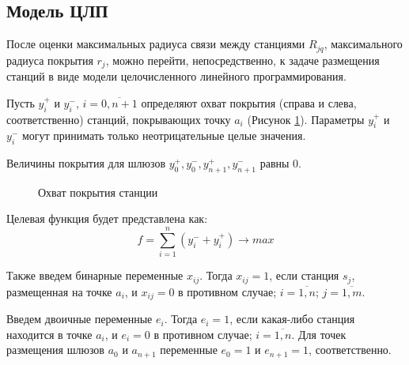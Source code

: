 


\subsection{Модель ЦЛП}

После оценки максимальных радиуса связи между станциями $R_{jq}$, максимального радиуса покрытия $r_j$, можно перейти, непосредственно, к задаче размещения станций в виде модели целочисленного линейного программирования.

Пусть $y_i^+$ и $y_i^-$, $i= \overline{0,n+1}$ определяют охват покрытия (справа и слева, соответственно) станций, покрывающих точку $a_i$ (Рисунок \cref{fig:part3_station_coverage}). Параметры $y_i^+$ и $y_i^-$ могут принимать только неотрицательные целые значения.

Величины  покрытия для шлюзов $y_0^+, y_0^-, y_{n+1}^+, y_{n+1}^-$ равны 0.

\begin{figure}[ht]
  \caption{Охват покрытия станции}\label{fig:part3_station_coverage}
\end{figure}
 
Целевая функция будет представлена как:
\begin{equation}
  \label{eq:part3_objective_function}
  f =  \sum\limits_{i=1}^n (y_i^- + y_i^+) \rightarrow max
\end{equation}

Также введем бинарные переменные $x_{ij}$. Тогда $x_{ij}=1$, если станция $s_j$, размещенная на точке $a_i$, и $x_{ij}=0$ в противном случае; $i= \overline{1, n}$; $j = \overline{1,m}$.

Введем двоичные переменные $ e_i $. Тогда $ e_i = 1 $, если какая-либо станция находится в точке $ a_i $, и $ e_i = 0$  в противном случае; $ i = \overline {1, n} $. Для точек размещения шлюзов $ a_0 $ и $a_{n + 1}$ переменные $ e_0 = 1 $ и $ e_{n + 1} =1 $, соответственно. 

